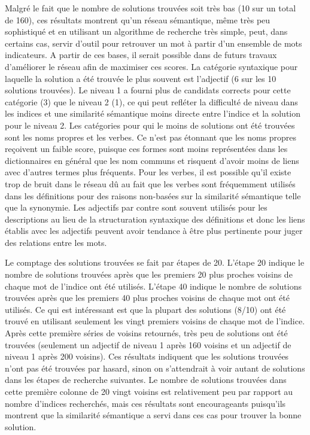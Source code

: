 {Malgré le fait que le nombre de solutions trouvées soit très bas (10 sur un total de 160), ces résultats montrent qu'un réseau sémantique, même très peu sophistiqué et en utilisant un algorithme de recherche très simple, peut, dans certains cas, servir d'outil pour retrouver un mot à partir d'un ensemble de mots indicateurs. A partir de ces bases, il serait possible dans de futurs travaux d'améliorer le réseau afin de maximiser ces scores. La catégorie syntaxique pour laquelle la solution a été trouvée le plus souvent est l'adjectif (6 sur les 10 solutions trouvées). Le niveau 1 a fourni plus de candidats corrects pour cette catégorie (3) que le niveau 2 (1), ce qui peut refléter la difficulté de niveau dans les indices et une similarité sémantique moins directe entre l'indice et la solution pour le niveau 2. Les catégories pour qui le moins de solutions ont été trouvées sont les noms propres et les verbes. Ce n'est pas étonnant que les noms propres reçoivent un faible score, puisque ces formes sont moins représentées dans les dictionnaires en général que les nom communs et risquent d'avoir moins de liens avec d'autres termes plus fréquents. Pour les verbes, il est possible qu'il existe trop de bruit dans le réseau dû au fait que les verbes sont fréquemment utilisés dans les définitions pour des raisons non-basées sur la similarité sémantique telle que la synonymie. Les adjectifs par contre sont souvent utilisés pour les descriptions au lieu de la structuration syntaxique des définitions et donc les liens établis avec les adjectifs peuvent avoir tendance à être plus pertinente pour juger des relations entre les mots.

Le comptage des solutions trouvées se fait par étapes de 20. L'étape 20 indique le nombre de solutions trouvées après que les premiers 20 plus proches voisins de chaque mot de l'indice ont été utilisés. L'étape 40 indique le nombre de solutions trouvées après que les premiers 40 plus proches voisins de chaque mot ont été utilisés. Ce qui est intéressant est que la plupart des solutions (8/10) ont été trouvé en utilisant seulement les vingt premiers voisins de chaque mot de l'indice. Après cette première séries de voisins retournés, très peu de solutions ont été trouvées (seulement un adjectif de niveau 1 après 160 voisins et un adjectif de niveau 1 après 200 voisins). Ces résultats indiquent que les solutions trouvées n'ont pas été trouvées par hasard, sinon on s'attendrait à voir autant de solutions dans les étapes de recherche suivantes. Le nombre de solutions trouvées dans cette première colonne de 20 vingt voisins est relativement peu par rapport au nombre d'indices recherchés, mais ces résultats sont encourageants puisqu'ils montrent que la similarité sémantique a servi dans ces cas pour trouver la bonne solution.

}
